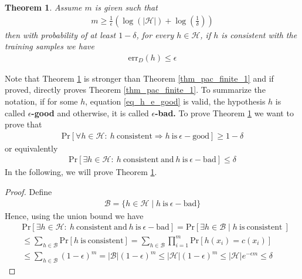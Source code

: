 \documentclass[10pt ]{article}
\newtheorem{thm}{Theorem}
\begin{document}
\begin{thm}
{\em 
Assume $m$ is given such that 
\begin{align}
m \ge \frac{1}{\epsilon} \left( \log(|\mathcal{H}|) + \log(\frac{1}{
\delta})\right)
\end{align}
then with probability of at least $1-\delta$, for every $h \in \mathcal{H}$, if $h$ is consistent with the training samples we have
\begin{align}
 \mathrm{err}_D(h) \le \epsilon 
 \label{eq_h_e_good}
\end{align}
}
\label{thm_pac_finite_2}
\end{thm}
Note that Theorem \ref{thm_pac_finite_2} is stronger than Theorem \ref{thm_pac_finite_1} and if proved, directly proves Theorem \ref{thm_pac_finite_1}. To summarize the notation, if for some $h$, equation \eqref{eq_h_e_good} is valid, the hypothesis $h$ is called \textbf{$\epsilon$-good} and otherwise, it is called \textbf{$\epsilon$-bad.} To prove Theorem \ref{thm_pac_finite_2} we want to prove that 
\begin{align}
\mathrm{Pr}\left[ \forall h \in \mathcal{H}: ~ h ~\mathrm{consistent} \Rightarrow h ~\mathrm{is}~ \epsilon-\mathrm{good}\right] \ge 1 - \delta
\end{align}
or equivalently 
\begin{align}
\mathrm{Pr}\left[ \exists h \in \mathcal{H}: ~ h ~\mathrm{consistent} ~\mathrm{and}~ h ~\mathrm{is}~ \epsilon-\mathrm{bad}\right] \le  \delta
\end{align}
In the following, we will prove Theorem \ref{thm_pac_finite_2}.
\begin{proof}
Define 
\begin{align}
\mathcal{B} = \{h \in \mathcal{H} \mid h ~\mathrm{is}~ \epsilon-\textrm{bad}\}
\end{align}
Hence, using the union bound we have 
\begin{align}
&\mathrm{Pr}\left[ \exists h \in \mathcal{H}: ~ h ~\mathrm{consistent} ~\mathrm{and}~ h ~\mathrm{is}~ \epsilon-\mathrm{bad}\right] = \mathrm{Pr}\left[ \exists h \in \mathcal{B} \mid h ~\mathrm{is~ consistent}~ \right] \nonumber \\
&\le \sum_{h \in \mathcal{B}} \mathrm{Pr} \left[ h ~\mathrm{is~ consistent} \right] = \sum_{h \in \mathcal{B}} \prod_{i=1}^m \mathrm{Pr} \left[ h(x_i) = c(x_i)\right] \nonumber \\
&\le \sum_{h \in \mathcal{B}}  (1-\epsilon)^m = |\mathcal{B}| (1-\epsilon)^m \le |\mathcal{H}| (1-\epsilon)^m \le |\mathcal{H}| e^{-\epsilon m} \le \delta 
\end{align}
\end{proof}
\end{document}
